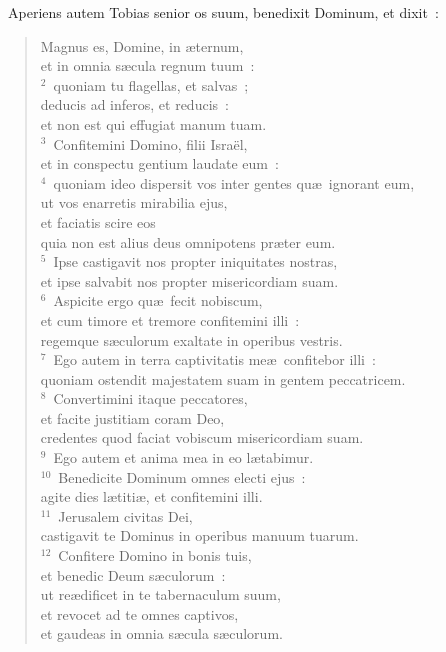 ~\lettrine[lines=10,image=true,loversize=0.05,lraise=-0.03]{A}{}periens autem Tobias senior os suum, benedixit Dominum, et dixit~: \begin{flushleft}\begin{verse}\vspace{6pt}Magnus es, Domine, in \ae ternum,\\ et in omnia s\ae cula regnum tuum~:\\
${}^{2}$~quoniam tu flagellas, et salvas~;\\ deducis ad inferos, et reducis~:\\ et non est qui effugiat manum tuam.\\
${}^{3}$~Confitemini Domino, filii Isra\"el,\\ et in conspectu gentium laudate eum~:\\
${}^{4}$~quoniam ideo dispersit vos inter gentes qu\ae\ ignorant eum,\\ ut vos enarretis mirabilia ejus,\\ et faciatis scire eos\\ quia non est alius deus omnipotens pr\ae ter eum.\\
${}^{5}$~Ipse castigavit nos propter iniquitates nostras,\\ et ipse salvabit nos propter misericordiam suam.\\
${}^{6}$~Aspicite ergo qu\ae\ fecit nobiscum,\\ et cum timore et tremore confitemini illi~:\\ regemque s\ae culorum exaltate in operibus vestris.\\
${}^{7}$~Ego autem in terra captivitatis me\ae\ confitebor illi~:\\ quoniam ostendit majestatem suam in gentem peccatricem.\\
${}^{8}$~Convertimini itaque peccatores,\\ et facite justitiam coram Deo,\\ credentes quod faciat vobiscum misericordiam suam.\\
${}^{9}$~Ego autem et anima mea in eo l\ae tabimur.\\
${}^{10}$~Benedicite Dominum omnes electi ejus~:\\ agite dies l\ae titi\ae , et confitemini illi.\\
${}^{11}$~Jerusalem civitas Dei,\\ castigavit te Dominus in operibus manuum tuarum.\\
${}^{12}$~Confitere Domino in bonis tuis,\\ et benedic Deum s\ae culorum~:\\ ut re\ae dificet in te tabernaculum suum,\\ et revocet ad te omnes captivos,\\ et gaudeas in omnia s\ae cula s\ae culorum.\\

\end{verse}
\end{flushleft}
